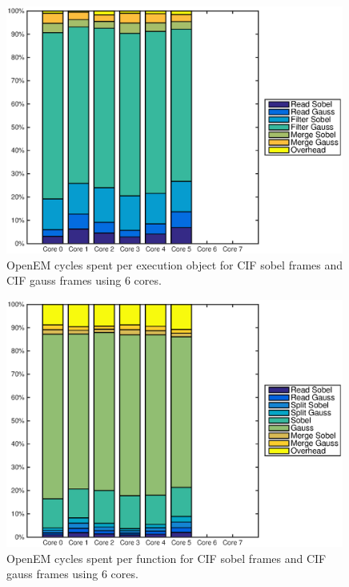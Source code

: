\begin{figure}[h!]
    \begin{center}
        \includegraphics[width=0.99\textwidth]{images/openem_cifcif_6cores_eo.eps}
        \caption{OpenEM cycles spent per execution object for CIF sobel frames and CIF gauss frames using 6 cores.}
        \label{fig:oem6coreeo}
    \end{center}
\end{figure}

\begin{figure}[h!]
    \begin{center}
        \includegraphics[width=0.99\textwidth]{images/openem_cifcif_6cores_func.eps}
        \caption{OpenEM cycles spent per function for CIF sobel frames and CIF gauss frames using 6 cores.}
        \label{fig:oem2corefunc}
    \end{center}
\end{figure}

